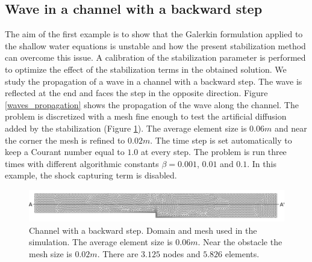 \documentclass[a4paper,12pt]{elsarticle}
\begin{document}
\subsection{Wave in a channel with a backward step}

The aim of the first example is to show that the Galerkin formulation applied to the shallow water equations is unstable and how the present stabilization method can overcome this issue. A calibration of the stabilization parameter is performed to optimize the effect of the stabilization terms in the obtained solution.
We study the propagation of a wave in a channel with a backward step. The wave is reflected at the end and faces the step in the opposite direction. Figure \ref{waves_propagation} shows the propagation of the wave along the channel.
The problem is discretized with a mesh fine enough to test the artificial diffusion added by the stabilization (Figure \ref{step_mesh}). The average element size is $0.06m$ and near the corner the mesh is refined to $0.02m$.
The time step is set automatically to keep a Courant number equal to $1.0$ at every step. The problem is run three times with different algorithmic constants $\beta = 0.001$, $0.01$ and $0.1$. In this example, the shock capturing term is disabled.

\begin{figure}
    \includegraphics[width=\textwidth]{img/step/mesh.pdf}
    \caption{Channel with a backward step. Domain and mesh used in the simulation. The average element size is $0.06m$. Near the obstacle the mesh size is $0.02m$. There are $3.125$ nodes and $5.826$ elements.}
    \label{step_mesh}
\end{figure}
\end{document}
